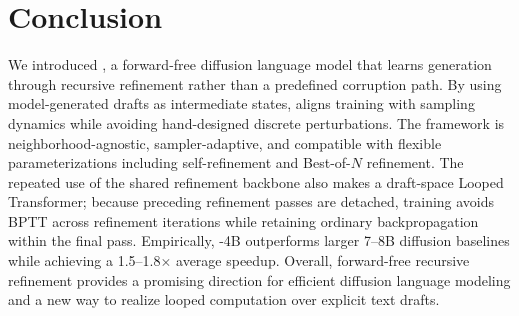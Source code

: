 \section{Conclusion}
\label{sec:conclusion}

We introduced \method, a forward-free diffusion language model that learns generation through recursive refinement rather than a predefined corruption path.
By using model-generated drafts as intermediate states, \method aligns training with sampling dynamics while avoiding hand-designed discrete perturbations.
The framework is neighborhood-agnostic, sampler-adaptive, and compatible with flexible parameterizations including self-refinement and Best-of-$N$ refinement.
The repeated use of the shared refinement backbone also makes \method a draft-space Looped Transformer; because preceding refinement passes are detached, training avoids BPTT across refinement iterations while retaining ordinary backpropagation within the final pass.
Empirically, \method-4B outperforms larger 7--8B diffusion baselines while achieving a 1.5--1.8$\times$ average speedup.
Overall, forward-free recursive refinement provides a promising direction for efficient diffusion language modeling and a new way to realize looped computation over explicit text drafts.
